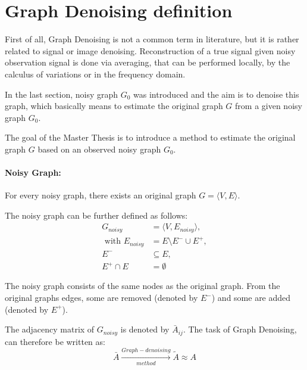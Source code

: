 \section{Graph Denoising definition}

First of all, Graph Denoising is not a common term in literature, but it is rather related to signal or image denoising.
Reconstruction of a true signal given noisy observation signal is done via averaging, that can be performed
locally, by the calculus of variations or in the frequency domain\cite{noneLocalMean}. 

In the last section, noisy graph $G_0$ was introduced and the aim is to denoise this graph,
which basically means to estimate the original graph $G$ from a given noisy graph $G_0$.

\begin{tcolorbox}[colback=red!5!white,colframe=red!75!black]
    The goal of the Master Thesis is to introduce a method to estimate 
    the original graph $G$ based on an observed noisy graph $G_0$.
\end{tcolorbox}

\paragraph{Noisy Graph:}
For every noisy graph, there exists an original graph $G = \langle V,E \rangle$.

The noisy graph can be further defined as follows:
\begin{equation}
    \begin{aligned}
        G_{noisy} &= \langle V,E_{noisy} \rangle,  \\ 
        \text{ with }  E_{noisy} &= E \setminus  E^{-} \cup  E^{+}, \\ 
         E^{-} & \subseteq E, \\
         E^{+} \cap E &= \emptyset
    \end{aligned}
\end{equation}

The noisy graph consists of the same nodes as the original graph. From
the original graphs edges, some are removed (denoted by $E^{-}$) and some are added
(denoted by $E^{+}$).

The adjacency matrix of $G_{noisy}$ is denoted by $\bar{A}_{ij}$.
The task of Graph Denoising, can therefore be written as:
\begin{equation}
    \bar{A} \xrightarrow[method]{Graph-denoising} \tilde{A} \approx A
\end{equation}

